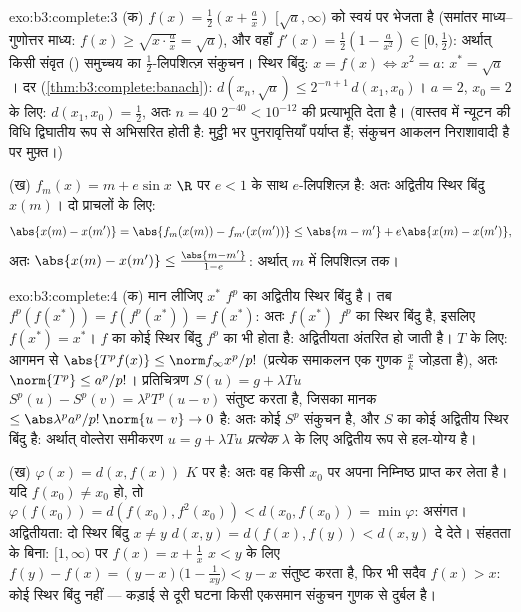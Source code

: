 \begin{solution}{exo:b3:complete:3}
(क) $f(x) = \frac12(x + \frac ax)$ $[\sqrt a, \infty)$ को स्वयं पर भेजता है (समांतर माध्य--गुणोत्तर माध्य:
$f(x) \geq \sqrt{x \cdot \frac ax} = \sqrt a$), और वहाँ $f'(x) = \frac12(1 - \frac a{x^2}) \in [0, \frac12)$: अर्थात् किसी संवृत () समुच्चय का
$\frac12$-लिपशित्ज़ संकुचन। स्थिर बिंदु: $x = f(x) \iff x^2 = a$: $x^* = \sqrt a$। दर (\cref{thm:b3:complete:banach}): $d(x_n, \sqrt a) \leq
2^{-n+1}\,d(x_1, x_0)$।
$a = 2$, $x_0 = 2$ के लिए: $d(x_1, x_0) =
\frac12$, अतः $n = 40$ $2^{-40} < 10^{-12}$ की प्रत्याभूति देता है।
(वास्तव में न्यूटन की विधि द्विघातीय रूप से अभिसरित होती है: मुट्ठी
भर पुनरावृत्तियाँ पर्याप्त हैं; संकुचन आकलन निराशावादी है पर मुफ़्त।)

(ख) $f_m(x) = m + e\sin x$  $\R$ पर $e < 1$ के साथ $e$-लिपशित्ज़ है: अतः अद्वितीय
स्थिर बिंदु $x(m)$। दो प्राचलों के लिए:
\[
\abs{x(m) - x(m')} = \abs{f_m(x(m)) - f_{m'}(x(m'))}
\leq \abs{m - m'} + e\abs{x(m) - x(m')},
\]
अतः $\abs{x(m) - x(m')} \leq \frac{\abs{m - m'}}{1 - e}$: अर्थात् $m$ में लिपशित्ज़ तक।
\end{solution}

\begin{solution}{exo:b3:complete:4}
(क) मान लीजिए $x^*$ $f^p$ का अद्वितीय स्थिर बिंदु है। तब $f^p(f(x^*)) = f(f^p(x^*)) = f(x^*)$: अतः
$f(x^*)$ $f^p$ का स्थिर बिंदु है, इसलिए $f(x^*) = x^*$। $f$ का कोई स्थिर बिंदु
$f^p$ का भी होता है: अद्वितीयता अंतरित हो जाती है। $T$ के लिए: आगमन
से $\abs{T^pf(x)}
\leq \norm f_\infty x^p/p!$ (प्रत्येक समाकलन एक गुणक $\frac xk$ जोड़ता है), अतः $\norm{T^p} \leq a^p/p!$।
प्रतिचित्रण $S(u) = g +
\lambda Tu$ $S^p(u) - S^p(v) = \lambda^pT^p(u - v)$ संतुष्ट करता है, जिसका मानक $\leq \abs\lambda^pa^p/p!\,\norm{u - v} \to 0$ है: अतः
कोई $S^p$ संकुचन है, और $S$ का कोई अद्वितीय स्थिर बिंदु है: अर्थात्
वोल्तेरा समीकरण $u = g + \lambda Tu$ \emph{प्रत्येक} $\lambda$ के लिए अद्वितीय रूप से
हल-योग्य है।

(ख) $\varphi(x) = d(x, f(x))$  $K$ पर  है: अतः वह किसी $x_0$ पर अपना निम्निष्ठ
प्राप्त कर लेता है। यदि $f(x_0) \neq x_0$ हो, तो $\varphi(f(x_0)) = d(f(x_0), f^2(x_0)) < d(x_0, f(x_0)) =
\min\varphi$: असंगत। अद्वितीयता: दो
स्थिर बिंदु $x \ne y$ $d(x,y) = d(f(x), f(y)) < d(x,y)$ दे देते। संहतता के बिना: $[1, \infty)$ पर $f(x) = x + \frac1x$
$x < y$ के लिए $f(y) - f(x) = (y - x)\bigl(1 - \frac1{xy}\bigr) <
y - x$ संतुष्ट करता है, फिर भी सदैव $f(x) > x$: कोई स्थिर
बिंदु नहीं --- कड़ाई से दूरी घटना किसी एकसमान संकुचन गुणक से दुर्बल
है।
\end{solution}

